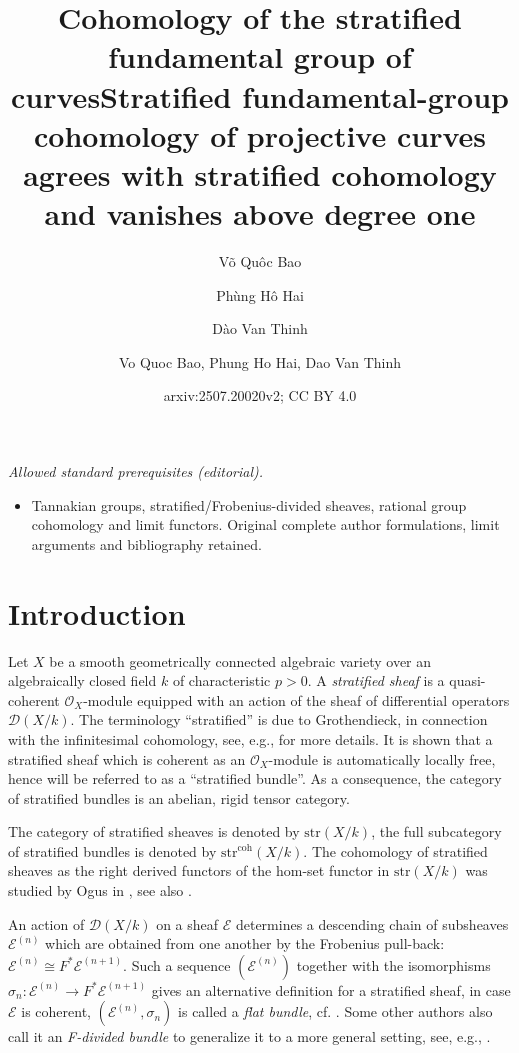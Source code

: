 \documentclass[12pt,a4]{amsart}
\author[VQ Bao]{V\~o Qu\^oc Bao}
\author[PH Hai]{Ph\`ung H\^o Hai}
\author[DV Thinh]{D\`ao Van Thinh}
\title[Cohomology of the stratified fundamental group]{Cohomology of the stratified fundamental group of curves}
\title{Stratified fundamental-group cohomology of projective curves agrees with stratified cohomology and vanishes above degree one}
\author{Vo Quoc Bao, Phung Ho Hai, Dao Van Thinh}
\date{arxiv:2507.20020v2; CC BY 4.0}
\theoremstyle{definition}
\begin{document}
\maketitle
\noindent\textit{Allowed standard prerequisites (editorial).}\begin{itemize}
\item Tannakian groups, stratified/Frobenius-divided sheaves, rational group cohomology and limit functors. Original complete author formulations, limit arguments and bibliography retained.
\end{itemize}\medskip
\section{Introduction}
Let $X$ be a smooth geometrically connected algebraic variety over an algebraically
closed field $k$ of characteristic $p>0$. 
A \textit{stratified sheaf} is a quasi-coherent $\mathcal O_X$-module equipped with an action of the sheaf
of differential operators $\mathcal D (X/k)$. The terminology ``stratified'' is due to Grothendieck,
in connection with the infinitesimal cohomology,
see, e.g., \cite[Section~2]{BO78} for more details. It is shown that a stratified sheaf which is
coherent as an $\mathcal O_X$-module is automatically locally free, hence will be referred to as a
``stratified bundle''. As a consequence, the category of stratified bundles is an abelian, rigid tensor
category.

The category of stratified sheaves is denoted by
$\mathrm{str}(X/k)$, the full subcategory  of stratified bundles is denoted by
$\mathrm{str}^\mathrm{coh}(X/k)$. The cohomology of stratified sheaves as the right derived
functors of the hom-set functor in $\mathrm{str}(X/k)$ was studied by Ogus in \cite{Og75}, see
also \cite{Hai13}. 
 

An action of $\mathcal D (X/k)$ on a sheaf $\mathcal E$ 
determines a descending chain of subsheaves $\mathcal E^{(n)}$ which are obtained
from one another by the Frobenius pull-back: $\mathcal E^{(n)}\cong
F^*\mathcal E^{(n+1)}$. Such a sequence $(\mathcal E^{(n)})$ together with
the isomorphisms $\sigma_n:\mathcal E^{(n)}\longrightarrow
F^*\mathcal E^{(n+1)}$ gives an alternative definition
for a stratified sheaf, in case $\mathcal E$ is coherent, 
\((\mathcal E^{(n)},\sigma_n)\) is called a \textit{flat bundle}, cf.  \cite[Section~1]{Gie75}. 
Some other authors also call it an \textit{F-divided  bundle} to generalize it to a more general
setting, see, e.g., \cite{BHdS23}.
\end{document}
